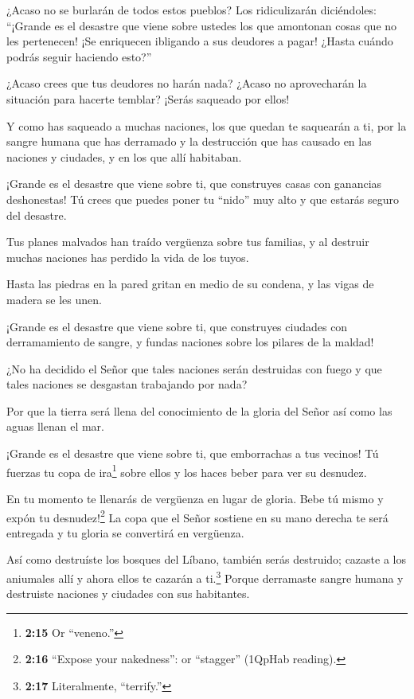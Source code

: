  ¿Acaso no se burlarán de todos estos pueblos? Los
ridiculizarán diciéndoles: ``¡Grande es el desastre que viene sobre
ustedes los que amontonan cosas que no les pertenecen! ¡Se enriquecen
ibligando a sus deudores a pagar! ¿Hasta cuándo podrás seguir haciendo
esto?''

 ¿Acaso crees que tus deudores no harán nada? ¿Acaso no
aprovecharán la situación para hacerte temblar? ¡Serás saqueado por
ellos!

 Y como has saqueado a muchas naciones, los que quedan te
saquearán a ti, por la sangre humana que has derramado y la destrucción
que has causado en las naciones y ciudades, y en los que allí habitaban.

 ¡Grande es el desastre que viene sobre ti, que construyes
casas con ganancias deshonestas! Tú crees que puedes poner tu ``nido''
muy alto y que estarás seguro del desastre.

 Tus planes malvados han traído vergüenza sobre tus
familias, y al destruir muchas naciones has perdido la vida de los
tuyos.

 Hasta las piedras en la pared gritan en medio de su
condena, y las vigas de madera se les unen.

 ¡Grande es el desastre que viene sobre ti, que construyes
ciudades con derramamiento de sangre, y fundas naciones sobre los
pilares de la maldad!

 ¿No ha decidido el Señor que tales naciones serán
destruidas con fuego y que tales naciones se desgastan trabajando por
nada?

 Por que la tierra será llena del conocimiento de la gloria
del Señor así como las aguas llenan el mar.

 ¡Grande es el desastre que viene sobre ti, que emborrachas
a tus vecinos! Tú fuerzas tu copa de ira\footnote{\textbf{2:15} Or
  ``veneno.''} sobre ellos y los haces beber para ver su desnudez.

 En tu momento te llenarás de vergüenza en lugar de gloria.
Bebe tú mismo y expón tu desnudez!\footnote{\textbf{2:16} ``Expose your
  nakedness'': or ``stagger'' (1QpHab reading).} La copa que el Señor
sostiene en su mano derecha te será entregada y tu gloria se convertirá
en vergüenza.

 Así como destruíste los bosques del Líbano, también serás
destruido; cazaste a los aniumales allí y ahora ellos te cazarán a
ti.\footnote{\textbf{2:17} Literalmente, ``terrify.''} Porque derramaste
sangre humana y destruiste naciones y ciudades con sus habitantes.

